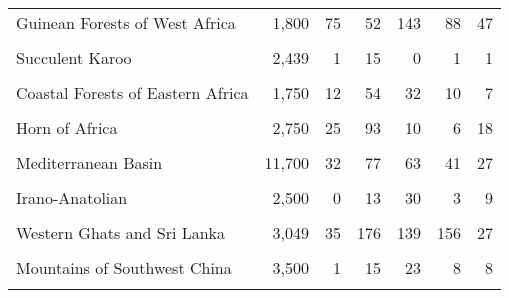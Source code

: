 \documentclass[
  12pt,
]{article}
\begin{document}
\begin{table}[H]
\begin{tabular}[t]{lrrrrrr}
Guinean Forests of West Africa & 1,800 & 75 & 52 & 143 & 88 & 47\\
\cellcolor{gray!6}{Cape Floristic Region} & \cellcolor{gray!6}{6,210} & \cellcolor{gray!6}{6} & \cellcolor{gray!6}{22} & \cellcolor{gray!6}{14} & \cellcolor{gray!6}{16} & \cellcolor{gray!6}{0}\\
Succulent Karoo & 2,439 & 1 & 15 & 0 & 1 & 1\\
\cellcolor{gray!6}{Maputal and Pondoland-Albany} & \cellcolor{gray!6}{1,900} & \cellcolor{gray!6}{0} & \cellcolor{gray!6}{36} & \cellcolor{gray!6}{20} & \cellcolor{gray!6}{11} & \cellcolor{gray!6}{3}\\
Coastal Forests of Eastern Africa & 1,750 & 12 & 54 & 32 & 10 & 7\\
\cellcolor{gray!6}{Eastern Afromontane} & \cellcolor{gray!6}{2,356} & \cellcolor{gray!6}{110} & \cellcolor{gray!6}{93} & \cellcolor{gray!6}{617} & \cellcolor{gray!6}{75} & \cellcolor{gray!6}{52}\\
Horn of Africa & 2,750 & 25 & 93 & 10 & 6 & 18\\
\cellcolor{gray!6}{Madagascar and Indian Ocean Islands} & \cellcolor{gray!6}{11,600} & \cellcolor{gray!6}{183} & \cellcolor{gray!6}{367} & \cellcolor{gray!6}{97} & \cellcolor{gray!6}{249} & \cellcolor{gray!6}{192}\\
Mediterranean Basin & 11,700 & 32 & 77 & 63 & 41 & 27\\
\cellcolor{gray!6}{Caucasus} & \cellcolor{gray!6}{1,600} & \cellcolor{gray!6}{2} & \cellcolor{gray!6}{20} & \cellcolor{gray!6}{12} & \cellcolor{gray!6}{3} & \cellcolor{gray!6}{12}\\
Irano-Anatolian & 2,500 & 0 & 13 & 30 & 3 & 9\\
\cellcolor{gray!6}{Mountains of Central Asia} & \cellcolor{gray!6}{1,500} & \cellcolor{gray!6}{0} & \cellcolor{gray!6}{1} & \cellcolor{gray!6}{5} & \cellcolor{gray!6}{4} & \cellcolor{gray!6}{7}\\
Western Ghats and Sri Lanka & 3,049 & 35 & 176 & 139 & 156 & 27\\
\cellcolor{gray!6}{Himalaya} & \cellcolor{gray!6}{3,160} & \cellcolor{gray!6}{15} & \cellcolor{gray!6}{49} & \cellcolor{gray!6}{33} & \cellcolor{gray!6}{46} & \cellcolor{gray!6}{18}\\
Mountains of Southwest China & 3,500 & 1 & 15 & 23 & 8 & 8\\
\cellcolor{gray!6}{Indo-Burma} & \cellcolor{gray!6}{7,000} & \cellcolor{gray!6}{73} & \cellcolor{gray!6}{204} & \cellcolor{gray!6}{553} & \cellcolor{gray!6}{193} & \cellcolor{gray!6}{100}\\

\end{tabular}
\end{table}
\end{document}
